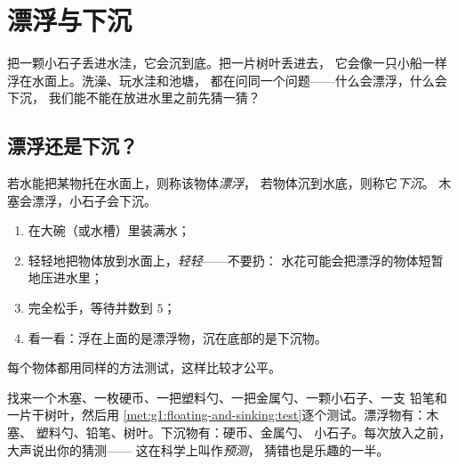 \chapter{漂浮与下沉}\label{ch:g1:floating-and-sinking}

把一颗小石子丢进水洼，它会沉到底。把一片树叶丢进去，
它会像一只小船一样浮在水面上。洗澡、玩水洼和池塘，
都在问同一个问题——什么会漂浮，什么会下沉，
我们能不能在放进水里之前先猜一猜？

\section{漂浮还是下沉？}

\begin{definition}[漂浮与下沉]\label{def:g1:floating-and-sinking:words}
若水能把某物托在水面上，则称该物体\emph{漂浮}，
若物体沉到水底，则称它\emph{下沉}。
木塞会漂浮，小石子会下沉。
\end{definition}

\begin{method}[公平的漂浮测试]\label{met:g1:floating-and-sinking:test}
\begin{enumerate}
  \item 在大碗（或水槽）里装满水；
  \item 轻轻地把物体放到水面上，\emph{轻轻}——不要扔：
        水花可能会把漂浮的物体短暂地压进水里；
  \item 完全松手，等待并数到 $5$；
  \item 看一看：浮在上面的是漂浮物，沉在底部的是下沉物。
\end{enumerate}
每个物体都用同样的方法测试，这样比较才公平。
\end{method}

\begin{example}\label{ex:g1:floating-and-sinking:sorting}
找来一个木塞、一枚硬币、一把塑料勺、一把金属勺、一颗小石子、一支
铅笔和一片干树叶，然后用
\cref{met:g1:floating-and-sinking:test}逐个测试。漂浮物有：木塞、
塑料勺、铅笔、树叶。下沉物有：硬币、金属勺、
小石子。每次放入之前，大声说出你的猜测——
这在科学上叫作\emph{预测}，
猜错也是乐趣的一半。
\end{example}

